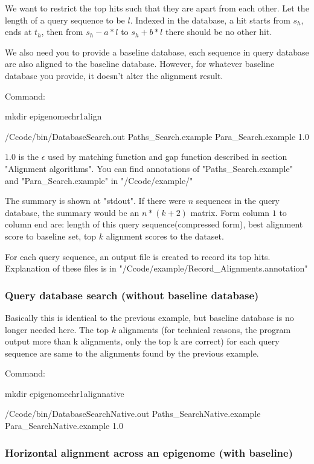 \documentclass[a4paper]{article}
\begin{document}
\begin{CJK*}{UTF8}{kai}
We want to restrict the top hits such that they are apart from each other. Let the length of a query sequence to be $l$. Indexed in the database, a hit starts from $s_h$, ends at $t_h$, then from $s_h-a*l$ to $s_h+b*l$ there should be no other hit. 

We also need you to provide a baseline database, each sequence in query database are also aligned to the baseline database. However, for whatever baseline database you provide, it doesn't alter the alignment result.

Command:

mkdir epigenomechr1align

/Ccode/bin/DatabaseSearch.out Paths\_Search.example Para\_Search.example 1.0

$1.0$ is the $\epsilon$ used by matching function and gap function described in section "Alignment algorithms". You can find annotations of "Paths\_Search.example" and "Para\_Search.example" in "/Ccode/example/"

The summary is shown at "stdout". If there were $n$ sequences in the query database, the summary would be an $n*(k+2)$ matrix. Form column $1$ to column end are: length of this query sequence(compressed form), best alignment score to baseline set, top $k$ alignment scores to the dataset. 

For each query sequence, an output file is created to record its top hits. Explanation of these files is in "/Ccode/example/Record\_Alignments.annotation"

\subsubsection{Query database search (without baseline database)}

Basically this is identical to the previous example, but baseline database is no longer needed here. The top $k$ alignments (for technical reasons, the program output more than k alignments, only the top k are correct) for each query sequence are same to the alignments found by the previous example.

Command:

mkdir epigenomechr1alignnative

/Ccode/bin/DatabaseSearchNative.out Paths\_SearchNative.example Para\_SearchNative.example 1.0

\subsubsection{Horizontal alignment across an epigenome (with baseline)}


\end{CJK*}
\end{document}
